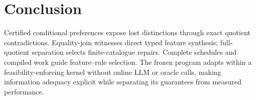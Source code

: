 \section{Conclusion}
\label{sec:conclusion}

Certified conditional preferences expose lost distinctions through exact
quotient contradictions. Equality-join witnesses direct typed feature
synthesis; full-quotient separation selects finite-catalogue repairs.
Complete schedules and compiled work guide feature--rule selection.
The frozen program adapts within a feasibility-enforcing kernel without
online LLM or oracle calls, making information adequacy explicit while
separating its guarantees from measured performance.
